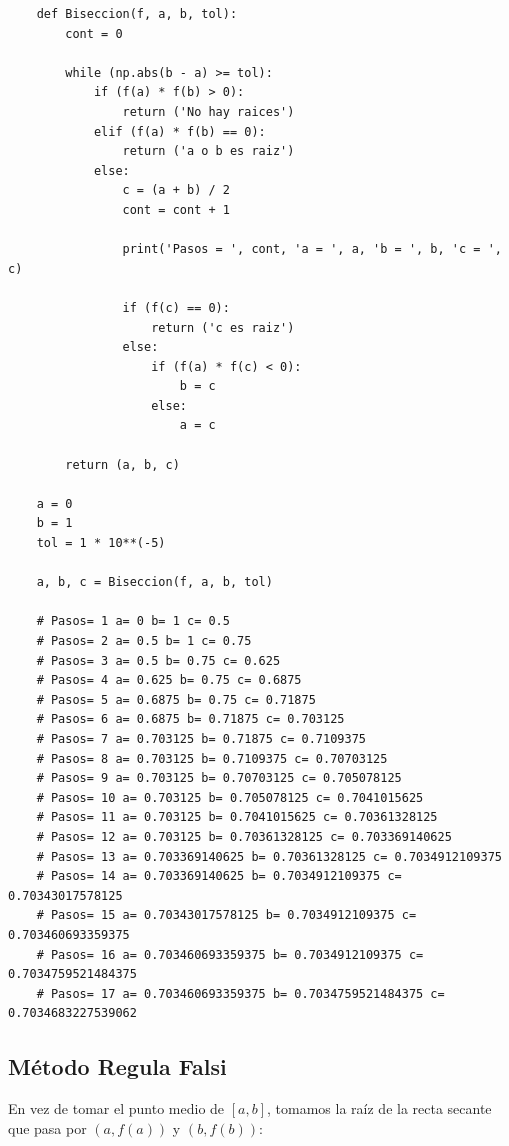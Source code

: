 \begin{verbatim}
    def Biseccion(f, a, b, tol):
        cont = 0
        
        while (np.abs(b - a) >= tol):
            if (f(a) * f(b) > 0):
                return ('No hay raices')
            elif (f(a) * f(b) == 0):
                return ('a o b es raiz')
            else:
                c = (a + b) / 2
                cont = cont + 1
                
                print('Pasos = ', cont, 'a = ', a, 'b = ', b, 'c = ', c)
                
                if (f(c) == 0):
                    return ('c es raiz')
                else:
                    if (f(a) * f(c) < 0):
                        b = c
                    else:
                        a = c
                    
        return (a, b, c)
    
    a = 0
    b = 1
    tol = 1 * 10**(-5)
    
    a, b, c = Biseccion(f, a, b, tol)
    
    # Pasos= 1 a= 0 b= 1 c= 0.5
    # Pasos= 2 a= 0.5 b= 1 c= 0.75
    # Pasos= 3 a= 0.5 b= 0.75 c= 0.625
    # Pasos= 4 a= 0.625 b= 0.75 c= 0.6875
    # Pasos= 5 a= 0.6875 b= 0.75 c= 0.71875
    # Pasos= 6 a= 0.6875 b= 0.71875 c= 0.703125
    # Pasos= 7 a= 0.703125 b= 0.71875 c= 0.7109375
    # Pasos= 8 a= 0.703125 b= 0.7109375 c= 0.70703125
    # Pasos= 9 a= 0.703125 b= 0.70703125 c= 0.705078125
    # Pasos= 10 a= 0.703125 b= 0.705078125 c= 0.7041015625
    # Pasos= 11 a= 0.703125 b= 0.7041015625 c= 0.70361328125
    # Pasos= 12 a= 0.703125 b= 0.70361328125 c= 0.703369140625
    # Pasos= 13 a= 0.703369140625 b= 0.70361328125 c= 0.7034912109375
    # Pasos= 14 a= 0.703369140625 b= 0.7034912109375 c= 0.70343017578125
    # Pasos= 15 a= 0.70343017578125 b= 0.7034912109375 c= 0.703460693359375
    # Pasos= 16 a= 0.703460693359375 b= 0.7034912109375 c= 0.7034759521484375
    # Pasos= 17 a= 0.703460693359375 b= 0.7034759521484375 c= 0.7034683227539062	
\end{verbatim}

\subsection{M\'etodo Regula Falsi}

En vez de tomar el punto medio de $[a, b]$, tomamos la ra\'iz de la recta secante que pasa por $(a, f(a))$ y $(b, f(b))$:\\

